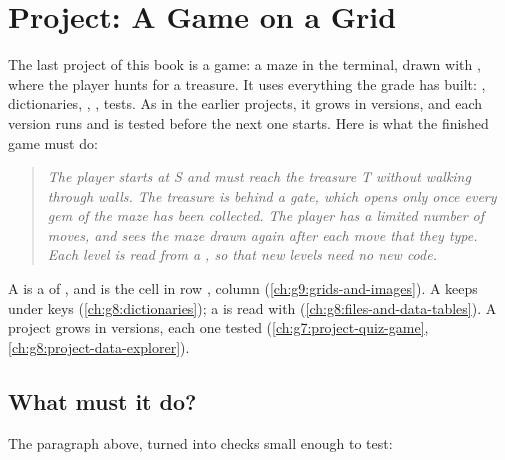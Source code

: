\chapter{Project: A Game on a Grid}\label{ch:g9:project-grid-game}

The last project of this book is a game: a maze in the terminal, drawn with
, where the player hunts for a treasure. It uses everything the
grade has built: , dictionaries, , , tests. As in the
earlier projects, it grows in versions, and each version runs and is tested
before the next one starts. Here is what the finished game must do:

\begin{quote}
\itshape The player starts at S and must reach the treasure T without walking
through walls. The treasure is behind a gate, which opens only once every gem
of the maze has been collected. The player has a limited number of moves, and
sees the maze drawn again after each move that they type. Each level is read
from a , so that new levels need no new code.
\end{quote}

\begin{recall}
A  is a  of , and  is the cell in row ,
column  (\cref{ch:g9:grids-and-images}). A  keeps 
under keys (\cref{ch:g8:dictionaries}); a  is read with 
(\cref{ch:g8:files-and-data-tables}). A project grows in versions, each one
tested (\cref{ch:g7:project-quiz-game}, \cref{ch:g8:project-data-explorer}).
\end{recall}

\section{What must it do?}

The paragraph above, turned into checks small enough to test:

